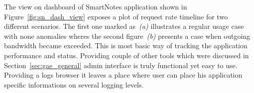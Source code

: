 The view on dashboard of SmartNotes application shown in Figure~\ref{fig:sn_dash_view} exposes a plot of request rate timeline for two different scenarios. The first  one marked as~\textit{(a)} illustrates a regular usage case with none anomalies wheres the second figure~\textit{(b)} presents a case when outgoing bandwidth became exceeded. This is most basic way of tracking the application performance and status. Providing couple of other tools which were discussed in Section~\ref{sec:gae_general} admin interface is truly functional yet easy to use. Providing a logs browser it leaves a place where user can place his application specific informations on several logging levels.     
\begin{figure}[ht]
  \begin{center}

\end{center}
\end{figure}
